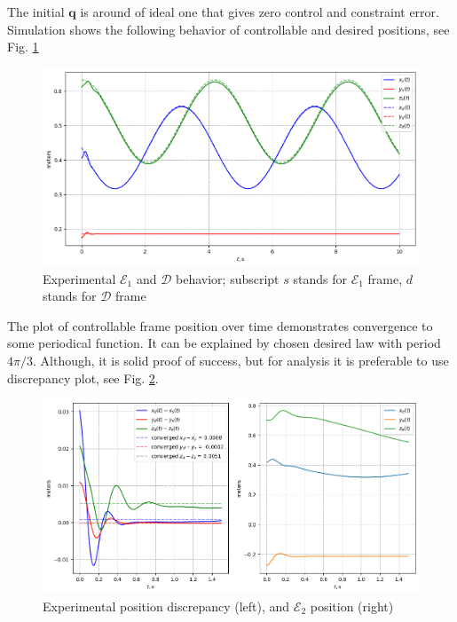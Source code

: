 The initial $\mathbf{q}$ is around of ideal one that gives zero control and 
constraint error. Simulation shows the following behavior of controllable 
and desired positions, see Fig. 
\ref{fig:start_and_des_pos}

\begin{figure}[H]
    \centering
    \includegraphics[scale=0.55]{figs/start_and_des_pos.png}
    \caption{Experimental $\mathcal{E}_1$ and $\mathcal{D}$ behavior; 
    subscript $s$ stands for $\mathcal{E}_1$ frame, 
    $d$ stands for $\mathcal{D}$ frame}
    \label{fig:start_and_des_pos}
\end{figure}

The plot of controllable frame position over time demonstrates 
convergence to some periodical function. It can be explained by chosen 
desired law with period $4 \pi / 3$. Although, it is solid proof of success, but 
for analysis it is preferable to use discrepancy plot, see Fig. 
\ref{fig:poses_plot}.

\begin{figure}[H]
    \centering
    \includegraphics[scale=0.60]{figs/poses_history.png}
    \caption{Experimental position discrepancy (left), and 
    $\mathcal{E}_2$ position (right)}
    \label{fig:poses_plot}
\end{figure}

